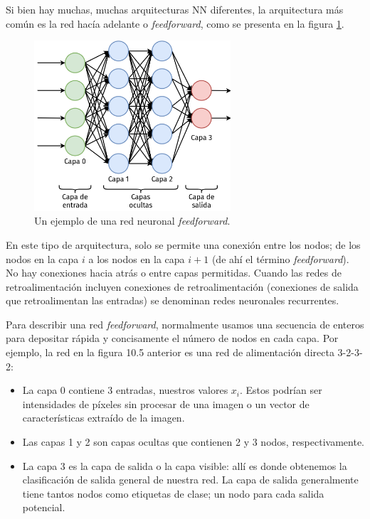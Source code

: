 \documentclass[a4paper,12pt]{article}
\begin{document}
Si bien hay muchas, muchas arquitecturas NN diferentes, la arquitectura más común es la red hacía adelante o \textit{feedforward}, como se presenta en la figura \ref{fig:nnff}.

\begin{figure}[H]
	\begin{center}				
		\includegraphics[width=0.65\textwidth]{022.png}
		\caption{Un ejemplo de una red neuronal \textit{feedforward}.}
		\label{fig:nnff}
	\end{center}
\end{figure}

En este tipo de arquitectura, solo se permite una conexión entre los nodos; de los nodos en la capa $i$ a los nodos en la capa $i + 1$ (de ahí el término \textit{feedforward}). No hay conexiones hacia atrás o entre capas permitidas. Cuando las redes de retroalimentación incluyen conexiones de retroalimentación (conexiones de salida que retroalimentan las entradas) se denominan redes neuronales recurrentes.

Para describir una red \textit{feedforward}, normalmente usamos una secuencia de enteros para depositar rápida y concisamente el número de nodos en cada capa. Por ejemplo, la red en la figura 10.5 anterior es una red de alimentación directa 3-2-3-2:

\begin{itemize}[noitemsep, topsep=2pt]
	\item La capa 0 contiene 3 entradas, nuestros valores $x_i$. Estos podrían ser intensidades de píxeles sin procesar de una imagen o un vector de características extraído de la imagen.
	\item Las capas 1 y 2 son capas ocultas que contienen 2 y 3 nodos, respectivamente.
	\item La capa 3 es la capa de salida o la capa visible: allí es donde obtenemos la clasificación de salida general de nuestra red. La capa de salida generalmente tiene tantos nodos como etiquetas de clase; un nodo para cada salida potencial.
\end{itemize}
\end{document}
